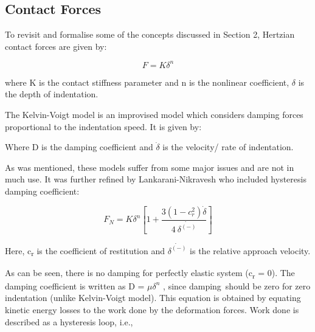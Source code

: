 \documentclass[12pt]{report}
\begin{document}
\subsection*{Contact Forces}
To revisit and formalise some of the concepts discussed in Section 2, Hertzian contact forces are given by:\par

 \[ F=K \delta ^{n} \] \par

where K is the contact stiffness parameter and n is the nonlinear coefficient,  \(  \delta  \)  is the depth of indentation. \par

The Kelvin-Voigt model is an improvised model which considers damping forces proportional to the indentation speed. It is given by:\par

\par

Where D is the damping coefficient and  \( \dot{ \delta } \)  is the velocity/ rate of indentation.\par

As was mentioned, these models suffer from some major issues and are not in much use. It was further refined by Lankarani-Nikravesh\cite{Lankarani1994} who included hysteresis damping coefficient: \par

 \[  \]  \[ F_{N}=K \delta ^{n} \left[ 1+ \frac{3 \left( 1-c_{r}^{2} \right) \dot{ \delta }}{4~\dot{ \delta ^{ \left( - \right) }}} \right]  \] \par

Here, c\textsubscript{r} is the coefficient of restitution and  \( \dot{ \delta ^{ \left( - \right) }} \)  is the relative approach velocity.\par

As can be seen, there is no damping for perfectly elastic system (c\textsubscript{r} = 0). The damping coefficient is written as D =  \(  \mu  \delta ^{n} \) , since damping\ should be zero for zero indentation (unlike Kelvin-Voigt model).  This equation is obtained by equating kinetic energy losses to the work done by the deformation forces. Work done is described as a hysteresis loop, i.e., \par
\end{document}

